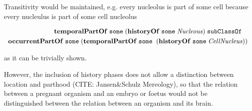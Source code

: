Transitivity would be maintained, e.g. every nucleolus is part of some cell because every nucleulus is part of some cell nucleolus  

\begin{equation}
\begin{split}
\mathrm{\mathbf{temporalPartOf}}\;\mathtt{some}\;(\mathrm{\mathbf{historyOf}}\;\mathtt{some}\;\mathit{Nucleous}) \;\mathtt{subClassOf}\ \; \; \\
\; \; \mathrm{\mathbf{occurrentPartOf}}\;\mathtt{some}\;(\mathrm{\mathbf{temporalPartOf}}\;\mathtt{some}\;
\;(\mathrm{\mathbf{historyOf}}\;\mathtt{some}\;\mathit{CellNucleus}))
\end{split}
\label{eq:historyCellNucleus}
\end{equation}    

as it can be trivially shown.


However, the inclusion of history phases does not allow a distinction between location and parthood (CITE: Jansen\&Schulz Mereology), so that the relation between a pregnant organism and an embryo or foetus would not be distinguished between the relation between an organism and its brain.


